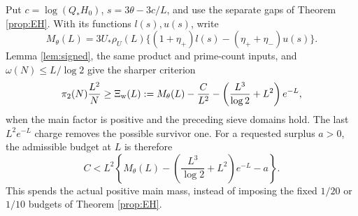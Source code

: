 \documentclass[11pt]{article}
\newcommand{\om}{\omega}
\begin{document}
Put $c=\log(Q_*H_0)$, $s=3\theta-3c/L$, and use the separate gaps of
Theorem \ref{prop:EH}. With its functions $l(s),u(s)$, write
\[
M_\theta(L)=3U_*\rho_U(L)
\{(1+\eta_+)l(s)-(\eta_++\eta_-)u(s)\}.
\]
Lemma \ref{lem:signed}, the same product and prime-count inputs, and
$\om(N)\le L/\log2$ give the sharper criterion
\begin{equation}\label{eq:signedcriterion}
\pi_2(N)\frac{L^2}{N}\ge
\Xi_{\rm w}(L):=M_\theta(L)-\frac{C}{L^2}
-\left(\frac{L^3}{\log2}+L^2\right)e^{-L},
\end{equation}
when the main factor is positive and the preceding sieve domains hold.
The last $L^2e^{-L}$ charge removes the possible survivor one.
For a requested surplus $a>0$, the admissible budget at $L$ is therefore
\[
C<L^2\left\{M_\theta(L)
-\left(\frac{L^3}{\log2}+L^2\right)e^{-L}-a\right\}.
\]
This spends the actual positive main mass, instead of imposing the
fixed $1/20$ or $1/10$ budgets of Theorem \ref{prop:EH}.
\end{document}
